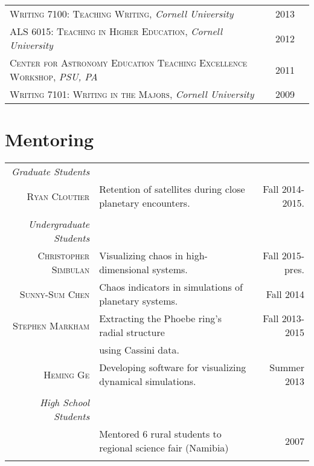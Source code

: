 \documentclass[10pt]{article} %
\begin{document}
\begin{tabular}{l>{\hfill}p{1.8cm}r}
\textsc{Writing 7100:  Teaching Writing}, {\it Cornell University} & 2013 \\
\textsc{ALS 6015:  Teaching in Higher Education}, {\it Cornell University} & 2012\\
\textsc{Center for Astronomy Education Teaching Excellence Workshop}, {\it PSU, PA} & 2011 \\
\textsc{Writing 7101: Writing in the Majors}, {\it Cornell University} & 2009 \\
\end{tabular}



\section{Mentoring}

\begin{tabular}{r|p{9.3cm}r}

{\it Graduate Students} \\
\textsc{Ryan Cloutier} & Retention of satellites during close planetary encounters. & Fall 2014-2015. \\
\\
{\it Undergraduate Students} \\
\textsc{Christopher Simbulan} & Visualizing chaos in high-dimensional systems. & Fall 2015-pres. \\
\textsc{Sunny-Sum Chen} & Chaos indicators in simulations of planetary systems. & Fall 2014 \\
\textsc{Stephen Markham} & Extracting the Phoebe ring's radial structure & Fall 2013-2015 \\
& using Cassini data. \\
\textsc{Heming Ge} & Developing software for visualizing dynamical simulations. & Summer 2013 \\
\\
{\it High School Students} \\
& Mentored 6 rural students to regional science fair (Namibia) & 2007 \\
\multicolumn{3}{c}{} \\
\end{tabular}

\end{document}
